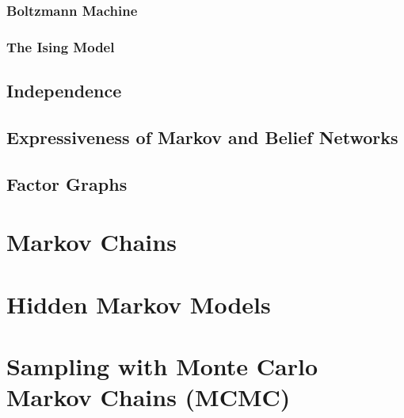 \subsubsection*{Boltzmann Machine}

\subsubsection*{The Ising Model}

\subsection{Independence}

\subsection{Expressiveness of Markov and Belief Networks}

\subsection{Factor Graphs}

\section{Markov Chains}

\section{Hidden Markov Models}

\section{Sampling with Monte Carlo Markov Chains (MCMC)}